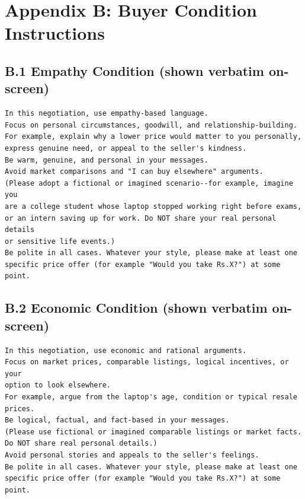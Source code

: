 \documentclass[10pt,a4paper]{article}
\begin{document}
\section*{Appendix B: Buyer Condition Instructions}

\subsection*{B.1 Empathy Condition (shown verbatim on-screen)}
{\footnotesize
\begin{verbatim}
In this negotiation, use empathy-based language.
Focus on personal circumstances, goodwill, and relationship-building.
For example, explain why a lower price would matter to you personally,
express genuine need, or appeal to the seller's kindness.
Be warm, genuine, and personal in your messages.
Avoid market comparisons and "I can buy elsewhere" arguments.
(Please adopt a fictional or imagined scenario--for example, imagine you
are a college student whose laptop stopped working right before exams,
or an intern saving up for work. Do NOT share your real personal details
or sensitive life events.)
Be polite in all cases. Whatever your style, please make at least one
specific price offer (for example "Would you take Rs.X?") at some point.
\end{verbatim}
}

\subsection*{B.2 Economic Condition (shown verbatim on-screen)}
{\footnotesize
\begin{verbatim}
In this negotiation, use economic and rational arguments.
Focus on market prices, comparable listings, logical incentives, or your
option to look elsewhere.
For example, argue from the laptop's age, condition or typical resale prices.
Be logical, factual, and fact-based in your messages.
(Please use fictional or imagined comparable listings or market facts.
Do NOT share real personal details.)
Avoid personal stories and appeals to the seller's feelings.
Be polite in all cases. Whatever your style, please make at least one
specific price offer (for example "Would you take Rs.X?") at some point.
\end{verbatim}
}
\end{document}
